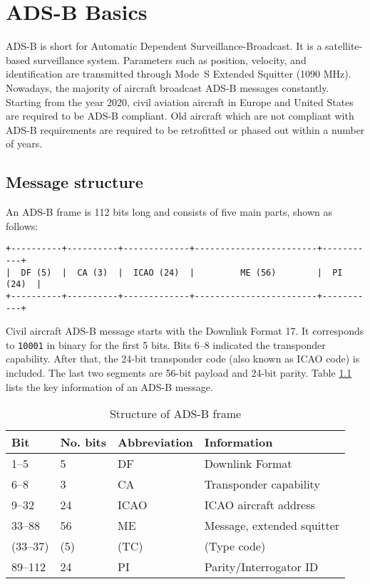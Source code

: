 \chapter{ADS-B Basics} \label{chap:adsb-basic}
ADS-B is short for Automatic Dependent Surveillance-Broadcast. It is a satellite-based surveillance system. Parameters such as position, velocity, and identification are transmitted through Mode~S Extended Squitter (1090 MHz). Nowadays, the majority of aircraft broadcast ADS-B messages constantly. Starting from the year 2020, civil aviation aircraft in Europe and United States are required to be ADS-B compliant. Old aircraft which are not compliant with ADS-B requirements are required to be retrofitted or phased out within a number of years.

\section{Message structure}

An ADS-B frame is 112 bits long and consists of five main parts, shown as follows:

\begin{verbatim}
+----------+----------+-------------+------------------------+-----------+
|  DF (5)  |  CA (3)  |  ICAO (24)  |         ME (56)        |  PI (24)  |
+----------+----------+-------------+------------------------+-----------+
\end{verbatim}

Civil aircraft ADS-B message starts with the Downlink Format 17. It corresponds to \texttt{10001} in binary for the first 5 bits. Bits 6--8 indicated the transponder capability. After that, the 24-bit transponder code (also known as ICAO code) is included. The last two segments are 56-bit payload and 24-bit parity. Table \ref{tb:adsb-structure} lists the key information of an ADS-B message.

\begin{table}[!ht]
\centering
\caption{Structure of ADS-B frame}
\label{tb:adsb-structure}
\begin{tabular}{|l|l|l|l|}
\hline
\textbf{Bit} & \textbf{No. bits} & \textbf{Abbreviation} & \textbf{Information} \\ \hline\hline
1--5 & 5 & DF & Downlink Format \\ \hline
6--8 & 3 & CA & Transponder capability \\ \hline
9--32 & 24 & ICAO & ICAO aircraft address \\ \hline
33--88 & 56 & ME & Message, extended squitter \\
(33--37) & (5) & (TC) & (Type code) \\ \hline
89--112 & 24 & PI & Parity/Interrogator ID \\ \hline
\end{tabular}
\end{table}

